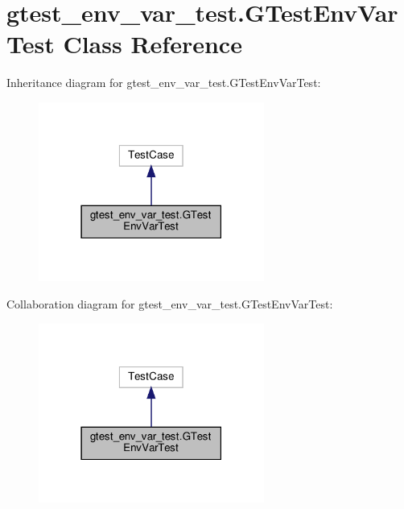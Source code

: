 \hypertarget{classgtest__env__var__test_1_1_g_test_env_var_test}{}\section{gtest\+\_\+env\+\_\+var\+\_\+test.\+G\+Test\+Env\+Var\+Test Class Reference}
\label{classgtest__env__var__test_1_1_g_test_env_var_test}


Inheritance diagram for gtest\+\_\+env\+\_\+var\+\_\+test.\+G\+Test\+Env\+Var\+Test\+:
\nopagebreak
\begin{figure}[H]
\begin{center}
\leavevmode
\includegraphics[width=210pt]{classgtest__env__var__test_1_1_g_test_env_var_test__inherit__graph}
\end{center}
\end{figure}


Collaboration diagram for gtest\+\_\+env\+\_\+var\+\_\+test.\+G\+Test\+Env\+Var\+Test\+:
\nopagebreak
\begin{figure}[H]
\begin{center}
\leavevmode
\includegraphics[width=210pt]{classgtest__env__var__test_1_1_g_test_env_var_test__coll__graph}
\end{center}
\end{figure}
